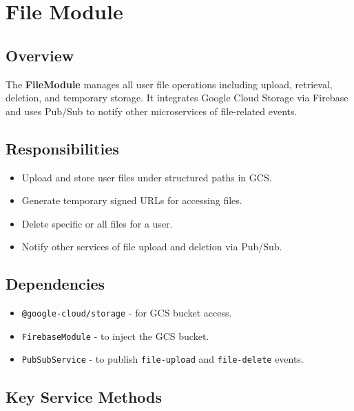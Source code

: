 \section{File Module}

\subsection*{Overview}

The \textbf{FileModule} manages all user file operations including upload, retrieval, deletion, and temporary storage. It integrates Google Cloud Storage via Firebase and uses Pub/Sub to notify other microservices of file-related events.

\subsection*{Responsibilities}

\begin{itemize}
    \item Upload and store user files under structured paths in GCS.
    \item Generate temporary signed URLs for accessing files.
    \item Delete specific or all files for a user.
    \item Notify other services of file upload and deletion via Pub/Sub.
\end{itemize}

\subsection*{Dependencies}

\begin{itemize}
    \item \texttt{@google-cloud/storage} - for GCS bucket access.
    \item \texttt{FirebaseModule} - to inject the GCS bucket.
    \item \texttt{PubSubService} - to publish \texttt{file-upload} and \texttt{file-delete} events.
\end{itemize}

\subsection*{Key Service Methods}

